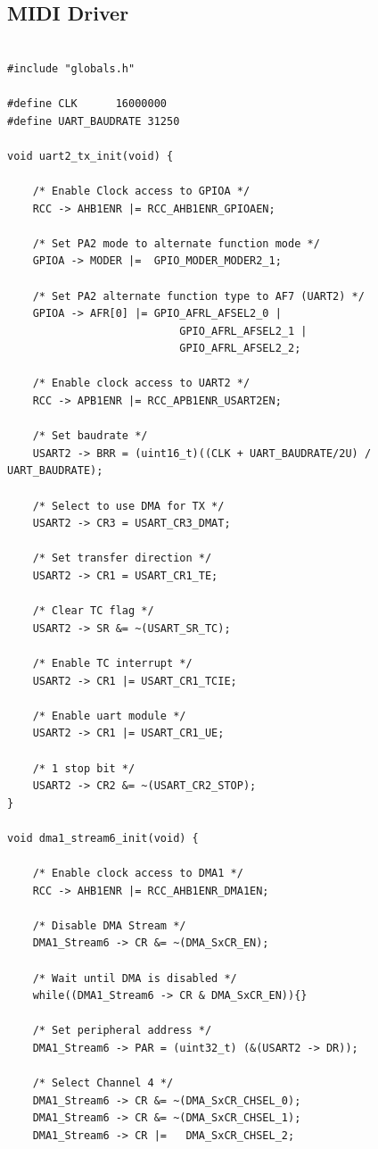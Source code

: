 \documentclass[12pt]{article}
\numberwithin{subsubsubsection}{subsubsection}
\begin{document}
\subsection{MIDI Driver}
\begin{verbatim}

#include "globals.h"

#define CLK      16000000
#define UART_BAUDRATE 31250

void uart2_tx_init(void) {

    /* Enable Clock access to GPIOA */
    RCC -> AHB1ENR |= RCC_AHB1ENR_GPIOAEN;
    
    /* Set PA2 mode to alternate function mode */
    GPIOA -> MODER |=  GPIO_MODER_MODER2_1;
    
    /* Set PA2 alternate function type to AF7 (UART2) */
    GPIOA -> AFR[0] |= GPIO_AFRL_AFSEL2_0 | 
                           GPIO_AFRL_AFSEL2_1 |       
                           GPIO_AFRL_AFSEL2_2;
    
    /* Enable clock access to UART2 */
    RCC -> APB1ENR |= RCC_APB1ENR_USART2EN;
    
    /* Set baudrate */
    USART2 -> BRR = (uint16_t)((CLK + UART_BAUDRATE/2U) / UART_BAUDRATE);
    
    /* Select to use DMA for TX */
    USART2 -> CR3 = USART_CR3_DMAT;
    
    /* Set transfer direction */
    USART2 -> CR1 = USART_CR1_TE;
    
    /* Clear TC flag */
    USART2 -> SR &= ~(USART_SR_TC);
    
    /* Enable TC interrupt */
    USART2 -> CR1 |= USART_CR1_TCIE;
    
    /* Enable uart module */
    USART2 -> CR1 |= USART_CR1_UE;
    
    /* 1 stop bit */
    USART2 -> CR2 &= ~(USART_CR2_STOP);
}

void dma1_stream6_init(void) {

    /* Enable clock access to DMA1 */
    RCC -> AHB1ENR |= RCC_AHB1ENR_DMA1EN;
    
    /* Disable DMA Stream */
    DMA1_Stream6 -> CR &= ~(DMA_SxCR_EN);
    
    /* Wait until DMA is disabled */
    while((DMA1_Stream6 -> CR & DMA_SxCR_EN)){}
    
    /* Set peripheral address */
    DMA1_Stream6 -> PAR = (uint32_t) (&(USART2 -> DR));
    
    /* Select Channel 4 */
    DMA1_Stream6 -> CR &= ~(DMA_SxCR_CHSEL_0);
    DMA1_Stream6 -> CR &= ~(DMA_SxCR_CHSEL_1);
    DMA1_Stream6 -> CR |=   DMA_SxCR_CHSEL_2;
    

\end{verbatim}
\end{document}
